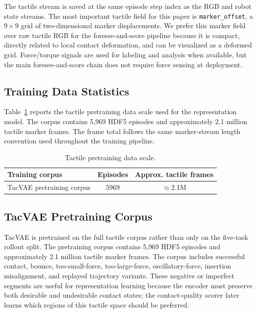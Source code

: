 \documentclass[10pt,letterpaper]{article}
\newcommand{\tabstyle}{\small\setlength{\tabcolsep}{3pt}\renewcommand{\arraystretch}{1.15}}
\begin{document}
The tactile stream is saved at the same episode step index as the RGB and robot
state streams. The most important tactile field for this paper is
\texttt{marker\_offset}, a $9\times9$ grid of two-dimensional marker
displacements. We prefer this marker field over raw tactile RGB for the
foresee-and-score pipeline because it is compact, directly related to local
contact deformation, and can be visualized as a deformed grid. Force/torque
signals are used for labeling and analysis when available, but the main
foresee-and-score chain does not require force sensing at deployment.

\subsection{Training Data Statistics}

Table~\ref{tab:data_inventory} reports the tactile pretraining data scale used
for the representation model. The corpus contains 5,969 HDF5 episodes and
approximately 2.1 million tactile marker frames. The frame total follows the
same marker-stream length convention used throughout the training pipeline.

\begin{table}[H]
\caption{Tactile pretraining data scale.}
\label{tab:data_inventory}
\centering
\tabstyle
\begin{tabular}{lcc}
\toprule
Training corpus & Episodes & Approx. tactile frames\\
\midrule
TacVAE pretraining corpus & 5969 & $\approx$2.1M\\
\bottomrule
\end{tabular}
\end{table}

\subsection{TacVAE Pretraining Corpus}

TacVAE is pretrained on the full tactile corpus rather than only on the
five-task rollout split. The pretraining corpus contains 5,969 HDF5
episodes and approximately 2.1 million tactile marker frames. The corpus
includes successful contact,
bounce, too-small-force, too-large-force, oscillatory-force, insertion
misalignment, and replayed trajectory variants. These negative or imperfect
segments are useful for representation learning because the encoder must
preserve both desirable and undesirable contact states; the contact-quality
scorer later learns which regions of this tactile space should be preferred.
\end{document}
